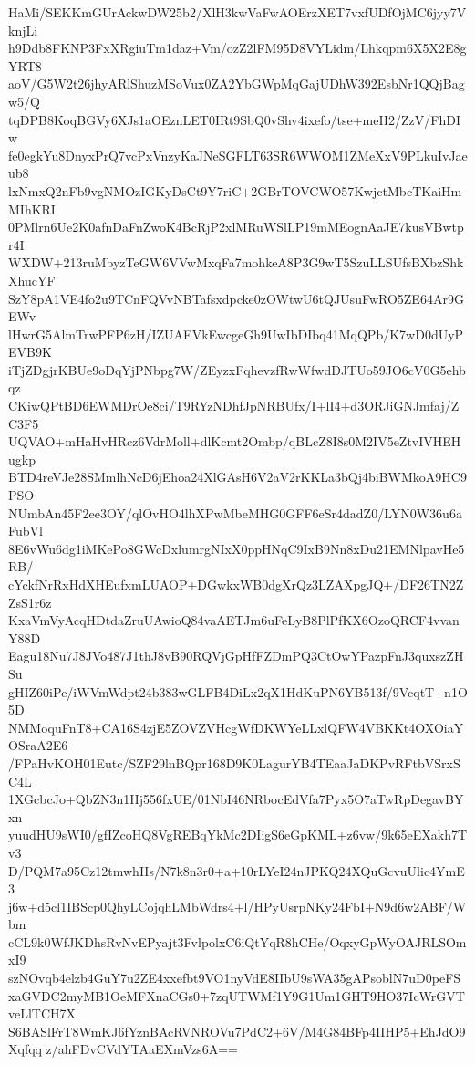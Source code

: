 HaMi/SEKKmGUrAckwDW25b2/XlH3kwVaFwAOErzXET7vxfUDfOjMC6jyy7VknjLi
h9Ddb8FKNP3FxXRgiuTm1daz+Vm/ozZ2lFM95D8VYLidm/Lhkqpm6X5X2E8gYRT8
aoV/G5W2t26jhyARlShuzMSoVux0ZA2YbGWpMqGajUDhW392EsbNr1QQjBagw5/Q
tqDPB8KoqBGVy6XJs1aOEznLET0IRt9SbQ0vShv4ixefo/tse+meH2/ZzV/FhDIw
fe0egkYu8DnyxPrQ7vcPxVnzyKaJNeSGFLT63SR6WWOM1ZMeXxV9PLkuIvJaeub8
lxNmxQ2nFb9vgNMOzIGKyDsCt9Y7riC+2GBrTOVCWO57KwjctMbcTKaiHmMIhKRI
0PMlrn6Ue2K0afnDaFnZwoK4BcRjP2xlMRuWSlLP19mMEognAaJE7kusVBwtpr4I
WXDW+213ruMbyzTeGW6VVwMxqFa7mohkeA8P3G9wT5SzuLLSUfsBXbzShkXhucYF
SzY8pA1VE4fo2u9TCnFQVvNBTafsxdpcke0zOWtwU6tQJUsuFwRO5ZE64Ar9GEWv
lHwrG5AlmTrwPFP6zH/IZUAEVkEwcgeGh9UwIbDIbq41MqQPb/K7wD0dUyPEVB9K
iTjZDgjrKBUe9oDqYjPNbpg7W/ZEyzxFqhevzfRwWfwdDJTUo59JO6cV0G5ehbqz
CKiwQPtBD6EWMDrOe8ci/T9RYzNDhfJpNRBUfx/I+lI4+d3ORJiGNJmfaj/ZC3F5
UQVAO+mHaHvHRcz6VdrMoll+dlKcmt2Ombp/qBLcZ8I8s0M2IV5eZtvIVHEHugkp
BTD4reVJe28SMmlhNcD6jEhoa24XlGAsH6V2aV2rKKLa3bQj4biBWMkoA9HC9PSO
NUmbAn45F2ee3OY/qlOvHO4lhXPwMbeMHG0GFF6eSr4dadZ0/LYN0W36u6aFubVl
8E6vWu6dg1iMKePo8GWcDxlumrgNIxX0ppHNqC9IxB9Nn8xDu21EMNlpavHe5RB/
cYckfNrRxHdXHEufxmLUAOP+DGwkxWB0dgXrQz3LZAXpgJQ+/DF26TN2ZZsS1r6z
KxaVmVyAcqHDtdaZruUAwioQ84vaAETJm6uFeLyB8PlPfKX6OzoQRCF4vvanY88D
Eagu18Nu7J8JVo487J1thJ8vB90RQVjGpHfFZDmPQ3CtOwYPazpFnJ3quxszZHSu
gHIZ60iPe/iWVmWdpt24b383wGLFB4DiLx2qX1HdKuPN6YB513f/9VcqtT+n1O5D
NMMoquFnT8+CA16S4zjE5ZOVZVHcgWfDKWYeLLxlQFW4VBKKt4OXOiaYOSraA2E6
/FPaHvKOH01Eutc/SZF29lnBQpr168D9K0LagurYB4TEaaJaDKPvRFtbVSrxSC4L
1XGcbcJo+QbZN3n1Hj556fxUE/01NbI46NRbocEdVfa7Pyx5O7aTwRpDegavBYxn
yuudHU9sWI0/gfIZcoHQ8VgREBqYkMc2DIigS6eGpKML+z6vw/9k65eEXakh7Tv3
D/PQM7a95Cz12tmwhIIs/N7k8n3r0+a+10rLYeI24nJPKQ24XQuGcvuUlic4YmE3
j6w+d5cl1IBScp0QhyLCojqhLMbWdrs4+l/HPyUsrpNKy24FbI+N9d6w2ABF/Wbm
cCL9k0WfJKDhsRvNvEPyajt3FvlpolxC6iQtYqR8hCHe/OqxyGpWyOAJRLSOmxI9
szNOvqb4elzb4GuY7u2ZE4xxefbt9VO1nyVdE8IIbU9sWA35gAPsoblN7uD0peFS
xaGVDC2myMB1OeMFXnaCGs0+7zqUTWMf1Y9G1Um1GHT9HO37IcWrGVTveLlTCH7X
S6BASlFrT8WmKJ6fYznBAcRVNROVu7PdC2+6V/M4G84BFp4IIHP5+EhJdO9Xqfqq
z/ahFDvCVdYTAaEXmVzs6A==
